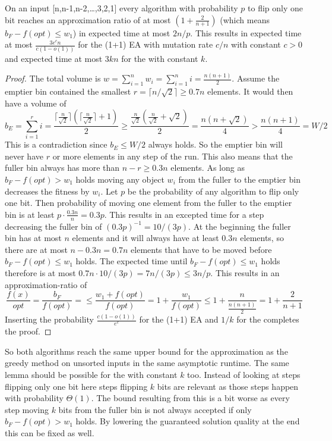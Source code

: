 \begin{lemma}
    On an input [n,n-1,n-2,\dots,3,2,1] every algorithm with probability $p$ to flip only one bit reaches an approximation ratio of at most $(1+\frac{2}{n+1})$ (which means $b_F-f(opt)\le w_1$) in expected time at most $2n/p$.
    This results in expected time at most $\frac{3e^{c}n}{c(1-o(1))}$ for the (1+1) EA with mutation rate $c/n$ with constant $c>0$ and expected time at most $3kn$ for the \RLSR[k] with constant $k$.
\end{lemma}
\begin{proof}
    The total volume is \(w=\sum_{i=1}^{n}{w_i}=\sum_{i=1}^{n}{i}=\frac{n(n+1)}{2}\).
    Assume the emptier bin contained the smallest $r=\lceil n/\sqrt{2}\rceil\ge 0.7n$ elements. It would then have a volume of
    \[
        b_E=\sum_{i=1}^{r}{i}
        =\frac{\lceil \frac{n}{\sqrt{2}}\rceil(\lceil \frac{n}{\sqrt{2}}\rceil+1)}{2}
        \ge\frac{\frac{n}{\sqrt{2}}(\frac{n}{\sqrt{2}}+\sqrt{2})}{2}
        =\frac{n(n+\sqrt{2})}{4}
        >\frac{n(n+1)}{4}
        = W/2
    \]
    This is a contradiction since $b_E\le W/2$ always holds.
    So the emptier bin will never have $r$ or more elements in any step of the run.
    This also means that the fuller bin always has more than $n-r\ge 0.3n$ elements.
    As long as $b_F-f(opt)>w_1$ holds moving any object $w_i$ from the fuller to the emptier bin decreases the fitness by $w_i$.
    Let $p$ be the probability of any algorithm to flip only one bit.
    Then probability of moving one element from the fuller to the emptier bin is at least $p\cdot\frac{0.3n}{n}=0.3p$.
    This results in an excepted time for a step decreasing the fuller bin of ${(0.3p)}^{-1}=10/(3p)$.
    At the beginning the fuller bin has at most $n$ elements and it will always have at least $0.3n$ elements, so there are at most $n-0.3n=0.7n$ elements that have to be moved before $b_F-f(opt)\le w_1$ holds.
    The expected time until $b_F-f(opt)\le w_1$ holds therefore is at most \(0.7n\cdot10/(3p)=7n/(3p)\le 3n/p\).
    This results in an approximation-ratio of
    \[
        \frac{f(x)}{opt}
        =\frac{b_F}{f(opt)}
        =\le\frac{w_1+f(opt)}{f(opt)}
        =1+\frac{w_1}{f(opt)}
        \le1+\frac{n}{\frac{n(n+1)}{2}}
        =1+\frac{2}{n+1}
    \]
    Inserting the probability $\frac{c(1-o(1))}{e^c}$ for the (1+1) EA and $1/k$ for the \RLSR[k] completes the proof.
\end{proof}

So both algorithms reach the same upper bound for the approximation as the greedy method on unsorted inputs in the same asymptotic runtime.
The same lemma should be possible for the \RLSN[k] with constant $k$ too.
Instead of looking at steps flipping only one bit here steps flipping $k$ bits are relevant as those steps happen with probability $\Theta(1)$.
The bound resulting from this is a bit worse as every step moving $k$ bits from the fuller bin is not always accepted if only $b_F-f(opt)>w_1$ holds.
By lowering the guaranteed solution quality at the end this can be fixed as well.

